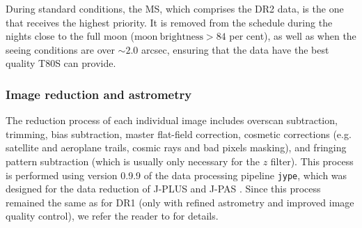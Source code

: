 \documentclass[fleqn,usenatbib]{mnras}
\begin{document}
During standard conditions, the MS, which comprises the DR2 data, is the one that receives the highest priority. It is removed from the schedule during the nights close to the full moon ($\mathrm{moon\ brightness} > 84$ per cent), as well as when the seeing conditions are over $\sim2.0$ arcsec, ensuring that the data have the best quality T80S can provide.

\subsubsection{Image reduction and astrometry}
\label{sec:astrometry}

The reduction process of each individual image includes overscan subtraction, trimming, bias subtraction, master flat-field correction, cosmetic corrections (e.g. satellite and aeroplane trails, cosmic rays and bad pixels masking),  and fringing pattern subtraction (which is usually only necessary for the $z$ filter). This process is performed using version 0.9.9 of the data processing pipeline \texttt{jype}, which was designed for the data reduction of J-PLUS and J-PAS \citep{2014SPIE.9152E..0OC}. Since this process remained the same as for DR1 (only with refined astrometry and improved image quality control), we refer the reader to \citet{MendesDeOliveira+2019} for details.
\end{document}
